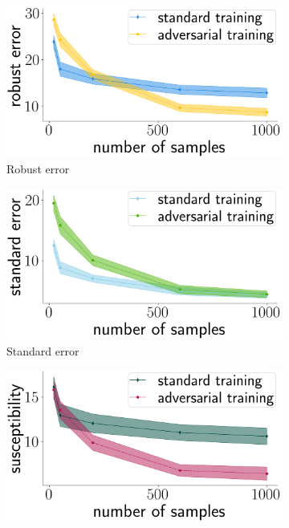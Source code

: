 \begin{figure}[!t]
\centering
\begin{subfigure}[b]{0.32\textwidth}
  \includegraphics[width=0.99\linewidth]{plotsAistats/numsamp_waterbirds_light.png}
  \caption{Robust error}
  \label{fig:app_waterbirds_robust_error}
\end{subfigure}
\begin{subfigure}[b]{0.32\textwidth}
  \includegraphics[width=0.99\linewidth]{plotsAistats/waterbirds_standard_numsamp.png}
  \caption{Standard error}
  \label{fig:app_waterbirds_standard_error}
\end{subfigure}
\begin{subfigure}[b]{0.32\textwidth}
  \includegraphics[width=0.99\linewidth]{plotsAistats/waterbirds_susceptibility_decomposition.png}

\end{subfigure}
\end{figure}
